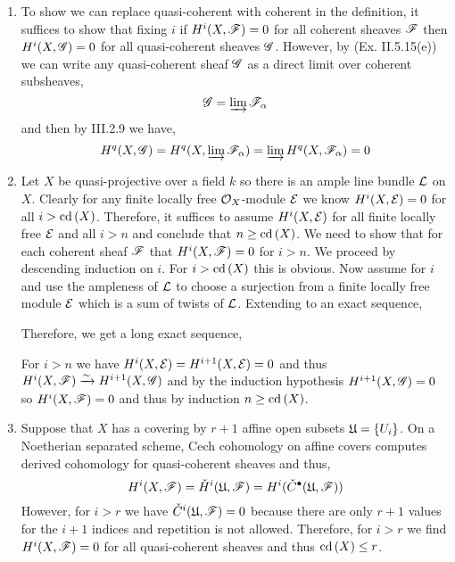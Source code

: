 \documentclass[12pt]{article}
\begin{document}
\begin{enumerate}
\item To show we can replace quasi-coherent with coherent in the definition, it suffices to show that fixing $i$ if $H^i(X, \mathscr{F}) = 0$ for all coherent sheaves $\mathscr{F}$ then $H^i(X, \mathscr{G}) = 0$ for all quasi-coherent sheaves $\mathscr{G}$. However, by (Ex. II.5.15(e)) we can write any quasi-coherent sheaf $\mathscr{G}$ as a direct limit over coherent subsheaves,
\[ \mathscr{G} = \varinjlim \mathscr{F}_\alpha \]
and then by III.2.9 we have,
\[ H^q(X, \mathscr{G}) = H^q(X, \varinjlim \mathscr{F}_\alpha) = \varinjlim H^q(X, \mathscr{F}_\alpha) = 0 \]

\item Let $X$ be quasi-projective over a field $k$ so there is an ample line bundle $\mathcal{L}$ on $X$. Clearly for any finite locally free $\mathcal{O}_{X}$-module $\mathcal{E}$ we know $H^i(X, \mathcal{E}) = 0$ for all $i > \mathrm{cd}\left( X \right)$. Therefore, it suffices to assume $H^i(X, \mathcal{E})$ for all finite locally free $\mathcal{E}$ and all $i > n$ and conclude that $n \ge \mathrm{cd}\left( X \right)$. We need to show that for each coherent sheaf $\mathscr{F}$ that $H^i(X, \mathscr{F}) = 0$ for $i > n$. We proceed by descending induction on $i$. For $i > \mathrm{cd}\left( X \right)$ this is obvious. Now assume for $i$ and use the ampleness of $\mathcal{L}$ to choose a surjection from a finite locally free module $\mathcal{E}$ which is a sum of twists of $\mathcal{L}$. Extending to an exact sequence,
\begin{center}
\end{center}
Therefore, we get a long exact sequence,
\begin{center}
\end{center}
For $i > n$ we have $H^i(X, \mathcal{E}) = H^{i+1}(X, \mathcal{E}) = 0$ and thus $H^i(X, \mathscr{F}) \xrightarrow{\sim} H^{i+1}(X, \mathscr{G})$ and by the induction hypothesis $H^{i+1}(X, \mathscr{G}) = 0$ so $H^i(X, \mathscr{F}) = 0$ and thus by induction $n \ge \mathrm{cd}\left( X \right)$.
 
\item Suppose that $X$ has a covering by $r+1$ affine open subsets $\mathfrak{U} = \{ U_i \}$. On a Noetherian separated scheme, Cech cohomology on affine covers computes derived cohomology for quasi-coherent sheaves and thus,
\[ H^i(X, \mathscr{F}) = \check{H}^i(\mathfrak{U}, \mathscr{F}) = H^i(\check{C}^\bullet(\mathfrak{U}, \mathscr{F})) \]
However, for $i > r$ we have $\check{C}^i(\mathfrak{U}, \mathscr{F}) = 0$ because there are only $r+1$ values for the $i+1$ indices and repetition is not allowed. Therefore, for $i > r$ we find $H^i(X, \mathscr{F}) = 0$ for all quasi-coherent sheaves and thus $\mathrm{cd}\left( X \right) \le r$.


\end{enumerate}
\end{document}
